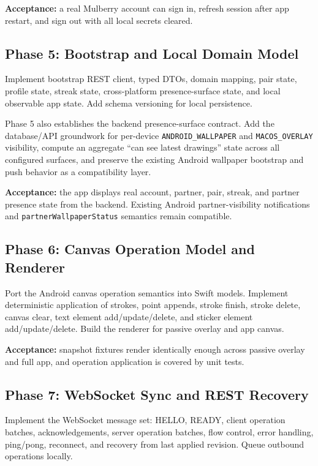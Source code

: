 \documentclass[11pt]{article}
\begin{document}
\textbf{Acceptance:} a real Mulberry account can sign in, refresh session after app restart, and sign out with all local secrets cleared.

\subsection{Phase 5: Bootstrap and Local Domain Model}

Implement bootstrap REST client, typed DTOs, domain mapping, pair state, profile state, streak state, cross-platform presence-surface state, and local observable app state. Add schema versioning for local persistence.

Phase 5 also establishes the backend presence-surface contract. Add the database/API groundwork for per-device \texttt{ANDROID\_WALLPAPER} and \texttt{MACOS\_OVERLAY} visibility, compute an aggregate ``can see latest drawings'' state across all configured surfaces, and preserve the existing Android wallpaper bootstrap and push behavior as a compatibility layer.

\textbf{Acceptance:} the app displays real account, partner, pair, streak, and partner presence state from the backend. Existing Android partner-visibility notifications and {\footnotesize\texttt{partnerWallpaperStatus}} semantics remain compatible.

\subsection{Phase 6: Canvas Operation Model and Renderer}

Port the Android canvas operation semantics into Swift models. Implement deterministic application of strokes, point appends, stroke finish, stroke delete, canvas clear, text element add/update/delete, and sticker element add/update/delete. Build the renderer for passive overlay and app canvas.

\textbf{Acceptance:} snapshot fixtures render identically enough across passive overlay and full app, and operation application is covered by unit tests.

\subsection{Phase 7: WebSocket Sync and REST Recovery}

Implement the WebSocket message set: HELLO, READY, client operation batches, acknowledgements, server operation batches, flow control, error handling, ping/pong, reconnect, and recovery from last applied revision. Queue outbound operations locally.
\end{document}
